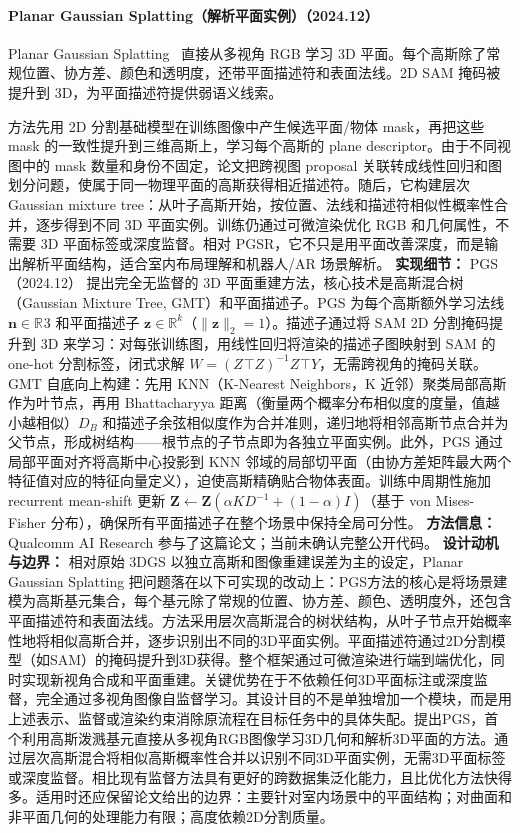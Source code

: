 \paragraph{Planar Gaussian Splatting（解析平面实例）（2024.12）}
Planar Gaussian Splatting~\cite{2412_01931} 直接从多视角 RGB 学习 3D 平面。每个高斯除了常规位置、协方差、颜色和透明度，还带平面描述符和表面法线。2D SAM 掩码被提升到 3D，为平面描述符提供弱语义线索。

方法先用 2D 分割基础模型在训练图像中产生候选平面/物体 mask，再把这些 mask 的一致性提升到三维高斯上，学习每个高斯的 plane descriptor。由于不同视图中的 mask 数量和身份不固定，论文把跨视图 proposal 关联转成线性回归和图划分问题，使属于同一物理平面的高斯获得相近描述符。随后，它构建层次 Gaussian mixture tree：从叶子高斯开始，按位置、法线和描述符相似性概率性合并，逐步得到不同 3D 平面实例。训练仍通过可微渲染优化 RGB 和几何属性，不需要 3D 平面标签或深度监督。相对 PGSR，它不只是用平面改善深度，而是输出解析平面结构，适合室内布局理解和机器人/AR 场景解析。
\textbf{实现细节：} PGS（2024.12） 提出完全无监督的 3D 平面重建方法，核心技术是高斯混合树（Gaussian Mixture Tree, GMT）和平面描述子。PGS 为每个高斯额外学习法线 $\mathbf{n} \in \mathbb{R}^{}3$ 和平面描述子 $\mathbf{z} \in \mathbb{R}^k$（$\|\mathbf{z}\|_2 = 1$）。描述子通过将 SAM 2D 分割掩码提升到 3D 来学习：对每张训练图，用线性回归将渲染的描述子图映射到 SAM 的 one-hot 分割标签，闭式求解 $W = (Z^{}\top Z)^{-1} Z^{}\top Y$，无需跨视角的掩码关联。GMT 自底向上构建：先用 KNN（K-Nearest Neighbors，K 近邻）聚类局部高斯作为叶节点，再用 Bhattacharyya 距离（衡量两个概率分布相似度的度量，值越小越相似）$D_B$ 和描述子余弦相似度作为合并准则，递归地将相邻高斯节点合并为父节点，形成树结构——根节点的子节点即为各独立平面实例。此外，PGS 通过局部平面对齐将高斯中心投影到 KNN 邻域的局部切平面（由协方差矩阵最大两个特征值对应的特征向量定义），迫使高斯精确贴合物体表面。训练中周期性施加 recurrent mean-shift 更新 $\mathbf{Z} \leftarrow \mathbf{Z}(\alpha K D^{-1} + (1-\alpha) I)$（基于 von Mises-Fisher 分布），确保所有平面描述子在整个场景中保持全局可分性。
\textbf{方法信息：} Qualcomm AI Research 参与了这篇论文；当前未确认完整公开代码。
\textbf{设计动机与边界：} 相对原始 3DGS 以独立高斯和图像重建误差为主的设定，Planar Gaussian Splatting 把问题落在以下可实现的改动上：PGS方法的核心是将场景建模为高斯基元集合，每个基元除了常规的位置、协方差、颜色、透明度外，还包含平面描述符和表面法线。方法采用层次高斯混合的树状结构，从叶子节点开始概率性地将相似高斯合并，逐步识别出不同的3D平面实例。平面描述符通过2D分割模型（如SAM）的掩码提升到3D获得。整个框架通过可微渲染进行端到端优化，同时实现新视角合成和平面重建。关键优势在于不依赖任何3D平面标注或深度监督，完全通过多视角图像自监督学习。其设计目的不是单独增加一个模块，而是用上述表示、监督或渲染约束消除原流程在目标任务中的具体失配。提出PGS，首个利用高斯泼溅基元直接从多视角RGB图像学习3D几何和解析3D平面的方法。通过层次高斯混合将相似高斯概率性合并以识别不同3D平面实例，无需3D平面标签或深度监督。相比现有监督方法具有更好的跨数据集泛化能力，且比优化方法快得多。适用时还应保留论文给出的边界：主要针对室内场景中的平面结构；对曲面和非平面几何的处理能力有限；高度依赖2D分割质量。
